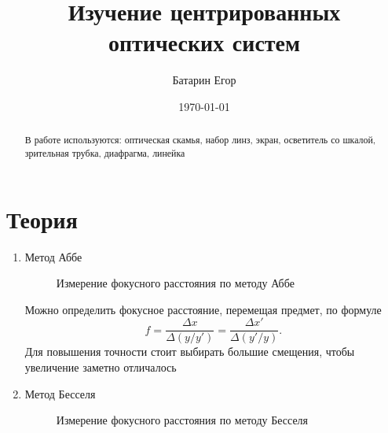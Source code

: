 \documentclass[a4paper,12pt]{article}
\author{Батарин Егор}
\title{Изучение центрированных оптических систем}
\date{\today}
\theoremstyle{plain} %
\theoremstyle{definition} %
\theoremstyle{remark} %
\begin{document}
 
\maketitle
 
\begin{abstract}
    В работе используются: оптическая скамья, набор линз, экран, осветитель со шкалой, зрительная трубка, диафрагма, линейка
\end{abstract}
 
\section{Теория}
\begin{enumerate}
    \item Метод Аббе
        \begin{figure}[h!]
        \caption{Измерение фокусного расстояния по методу Аббе}
        \end{figure}
 
    Можно определить фокусное расстояние, перемещая предмет, по формуле \[f = \frac{\Delta{}x}{\Delta{}(y/y')} = \frac{\Delta{}x'}{\Delta{}(y'/y)}.\] 
    Для повышения точности стоит выбирать большие смещения, чтобы увеличение заметно отличалось
 
    \item Метод Бесселя
        \begin{figure}[h!]
        \caption{Измерение фокусного расстояния по методу Бесселя}
        \end{figure}
 

\end{enumerate}
\end{document}
